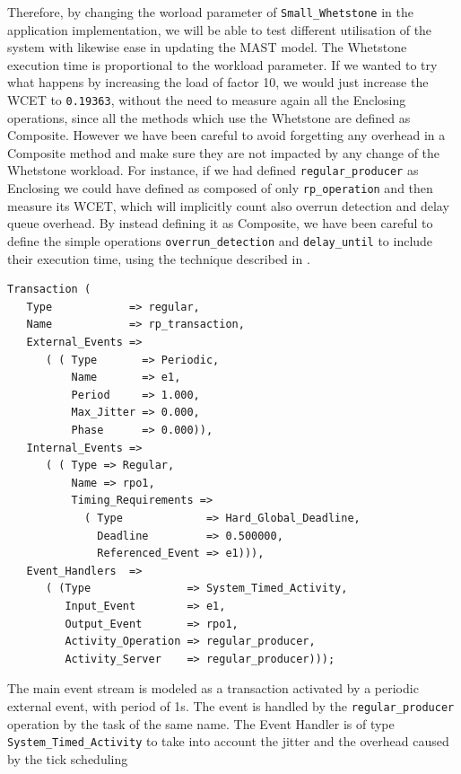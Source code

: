\documentclass{article}
\begin{document}
Therefore, by changing the worload parameter of \texttt{Small\_Whetstone} in the application implementation, we will be able to test different utilisation of the system with likewise ease in updating the MAST model. The Whetstone execution time is proportional to the workload parameter. If we wanted to try what happens by increasing the load of factor 10, we would just increase the WCET to \texttt{0.19363}, without the need to measure again all the Enclosing operations, since all the methods which use the Whetstone are defined as Composite. However we have been careful to avoid forgetting any overhead in a Composite method and make sure they are not impacted by any change of the Whetstone workload. For instance, if we had defined \texttt{regular\_producer} as Enclosing we could have defined as composed of only \texttt{rp\_operation} and then measure its WCET, which will implicitly count also overrun detection and delay queue overhead. By instead defining it as Composite, we have been careful to define the simple operations \texttt{overrun\_detection} and \texttt{delay\_until} to include their execution time, using the technique described in \cite{effects-runtime}.

\begin{lstlisting}
Transaction (
   Type            => regular,
   Name            => rp_transaction,
   External_Events =>
      ( ( Type       => Periodic,
          Name       => e1,
          Period     => 1.000,
          Max_Jitter => 0.000,
          Phase      => 0.000)),
   Internal_Events =>
      ( ( Type => Regular,
          Name => rpo1,
          Timing_Requirements =>
            ( Type             => Hard_Global_Deadline,
              Deadline         => 0.500000,
              Referenced_Event => e1))),
   Event_Handlers  =>
      ( (Type               => System_Timed_Activity,
         Input_Event        => e1,
         Output_Event       => rpo1,
         Activity_Operation => regular_producer,
         Activity_Server    => regular_producer)));
\end{lstlisting}

The main event stream is modeled as a transaction activated by a periodic external event, with period of 1s. The event is handled by the \texttt{regular\_producer} operation by the task of the same name. The Event Handler is of type \texttt{System\_Timed\_Activity} to take into account the jitter and the overhead caused by the tick scheduling
\end{document}
